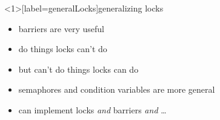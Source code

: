 \begin{frame}<1>[label=generalLocks]{generalizing locks}
    \begin{itemize}
    \item barriers are very useful
    \item do things locks can't do
    \item but can't do things locks can do
    \vspace{.5cm}
    \item semaphores and condition variables are more general
    \item can implement locks \textit{and} barriers \textit{and} \ldots
    \end{itemize} 
\end{frame}
